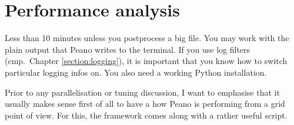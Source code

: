 \section{Performance analysis}
\label{section:performance-analysis}

\chapterDescription
  {
    Less than 10 minutes unless you postprocess a big file.
  }
  {
    You may work with the plain output that Peano writes to the terminal. If you
    use log filters (cmp.~Chapter \ref{section:logging}), it is important that
    you know how to switch particular logging infos on. You also need a working
    Python installation.
  }

\noindent
Prior to any parallelisation or tuning discussion, I want to emphasise that it
usually makes sense first of all to have a how Peano is performing from a grid
point of view. For this, the framework comes along with a rather useful script.

